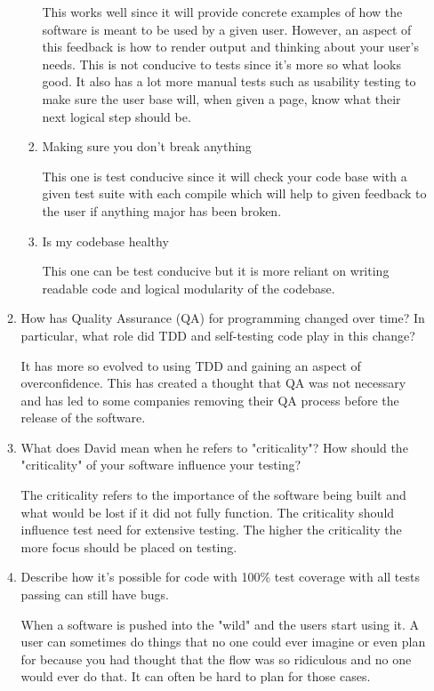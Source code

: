 \begin{enumerate}
\begin{enumerate}
\begin{enumerate}
						This works well since it will provide concrete examples of how the software is meant to be used by a given user.  However, an aspect of this feedback is how to render output  and thinking about your user's needs. This is not conducive to tests since it's more so what looks good.  It also has a lot more manual tests such as usability testing to make sure the user base will, when given a page, know what their next logical step should be.
						
					\item Making sure you don't break anything
					
						This one is test conducive since it will check your code base with a given test suite with each compile which will help to given feedback to the user if anything major has been broken.
						
					\item Is my codebase healthy
						
						This one can be test conducive but it is more reliant on writing readable code and logical modularity of the codebase.
						
				\end{enumerate}

			\item How has Quality Assurance (QA) for programming changed over time? In particular, what role did TDD and self-testing code play in this change?

				It has more so evolved to using TDD and gaining an aspect of overconfidence.  This has created a thought that QA was not necessary and has led to some companies removing their QA process before the release of the software.

			\item What does David mean when he refers to "criticality"? How should the "criticality" of your software influence your testing?

				The criticality refers to the importance of the software being built and what would be lost if it did not fully function.  The criticality should influence test need for extensive testing.  The higher the criticality the more focus should be placed on testing.

			\item Describe how it's possible for code with 100\% test coverage with all tests passing can still have bugs.

				When a software is pushed into the "wild" and the users start using it.  A user can sometimes do things that no one could ever imagine or even plan for because you had thought that the flow was so ridiculous and no one would ever do that.  It can often be hard to plan for those cases.


\end{enumerate}
\end{enumerate}
